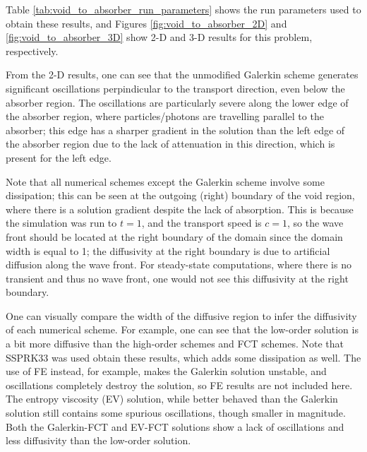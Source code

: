 Table \ref{tab:void_to_absorber_run_parameters} shows the run parameters used
to obtain these results, and Figures \ref{fig:void_to_absorber_2D}
and \ref{fig:void_to_absorber_3D} show 2-D and 3-D results for this
problem, respectively.

From the 2-D results, one can see that the unmodified Galerkin scheme
generates significant oscillations perpindicular to the transport
direction, even below the absorber region. The oscillations are
particularly severe along the lower edge of the absorber region,
where particles/photons are travelling parallel to the absorber;
this edge has a sharper gradient in the solution than the left
edge of the absorber region due to the lack of attenuation in
this direction, which is present for the left edge.

Note that all numerical schemes except the Galerkin scheme involve some
dissipation; this can be seen at the outgoing (right) boundary of the void
region, where there is a solution gradient despite the lack of
absorption. This is because the simulation was run to $t=1$, and the transport
speed is $c=1$, so the wave front should be located at the right
boundary of the domain since the domain width is equal to 1;
the diffusivity at the right boundary is due to artificial diffusion
along the wave front.
For steady-state computations, where there is no transient and
thus no wave front, one would not see this diffusivity
at the right boundary.

One can visually compare the width
of the diffusive region to infer the diffusivity of each
numerical scheme. For example, one can see that the low-order
solution is a bit more diffusive than the high-order schemes
and FCT schemes.
Note that SSPRK33 was used obtain these results, which
adds some dissipation as well. The use of FE instead, for example,
makes the Galerkin solution unstable, and oscillations completely
destroy the solution, so FE results are not included here.
The entropy viscosity (EV) solution, while better behaved than the
Galerkin solution still contains some spurious oscillations,
though smaller in magnitude. Both the Galerkin-FCT and EV-FCT
solutions show a lack of oscillations and less diffusivity than the low-order
solution.

